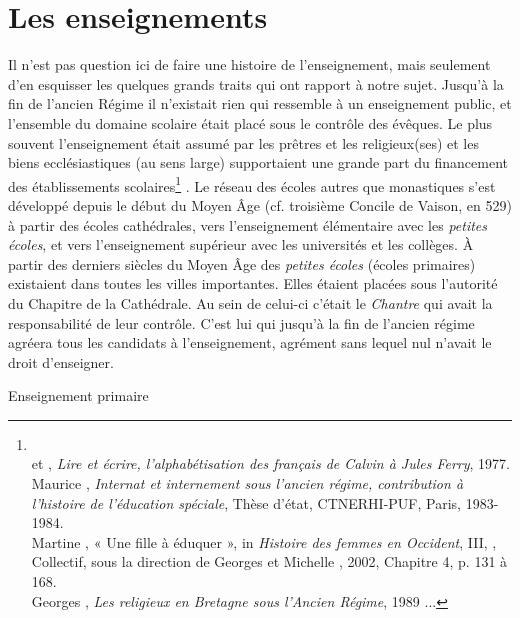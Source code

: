 

\section{Les enseignements}

    
   Il n'est pas question ici de faire une histoire de l'enseignement, mais seulement d'en esquisser les quelques grands traits qui ont rapport à notre sujet. Jusqu'à la fin de l'ancien Régime il n'existait rien qui ressemble à un enseignement public, et l'ensemble du domaine scolaire était placé sous le contrôle des évêques. Le plus souvent l'enseignement était assumé par les prêtres et les religieux(ses) et les biens ecclésiastiques (au sens large) supportaient une grande part du financement des établissements scolaires\footnote{\\ et , \emph{Lire et écrire, l'alphabétisation des français de Calvin à Jules Ferry}, 1977.
\\Maurice {}, \emph{Internat et internement sous l'ancien régime, contribution à l'histoire de l'éducation spéciale}, Thèse d'état, CTNERHI-PUF, Paris, 1983-1984.
\\Martine {}, {« Une fille à éduquer », in \emph{Histoire des femmes en Occident}, III, }, Collectif, sous la direction de Georges  et Michelle , 2002, Chapitre 4, p. 131 à 168.
\\Georges {}, \emph{Les religieux en Bretagne sous l'Ancien Régime}, 1989 ...}%
. Le réseau des écoles autres que monastiques s'est développé depuis le début du Moyen Âge (cf. troisième Concile de Vaison, en 529) à partir des écoles cathédrales, vers l'enseignement élémentaire avec les \emph{petites écoles}, et vers l'enseignement supérieur avec les universités et les collèges. À partir des derniers siècles du Moyen Âge des \emph{petites écoles} (écoles primaires) existaient dans toutes les villes importantes. Elles étaient placées sous l'autorité du Chapitre de la Cathédrale. Au sein de celui-ci c'était le \emph{Chantre} qui avait la responsabilité de leur contrôle. C'est lui qui jusqu'à la fin de l'ancien régime agréera tous les candidats à l'enseignement, agrément sans lequel nul n'avait le droit d'enseigner. 

Enseignement primaire

